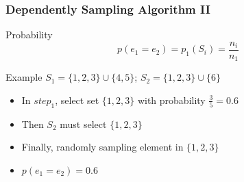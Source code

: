 \documentclass[notheorems, aspectratio=54]{beamer}
\begin{document}
\begin{frame}
    \frametitle{Dependently Sampling Algorithm II}
    \begin{block}{Probability}
        $$
            p(e_1 = e_2) = p_1(S_i) = \frac{n_i}{n_1}
        $$
    \end{block}
    \begin{block}{Example}
        $S_1 =  \{1,2,3\} \cup \{4,5\}$; $S_2 = \{1,2,3\} \cup \{6\}$
        \begin{itemize}
            \item In $step_1$, select set $\{1,2,3\}$ with probability $\frac{3}{5} = 0.6$
            \item Then $S_2$ must select $\{1,2,3\}$
            \item Finally, randomly sampling element in $\{1,2,3\}$
            \item $p(e_1 = e_2) = 0.6$
        \end{itemize}
    \end{block}
\end{frame}

        
\end{document}
